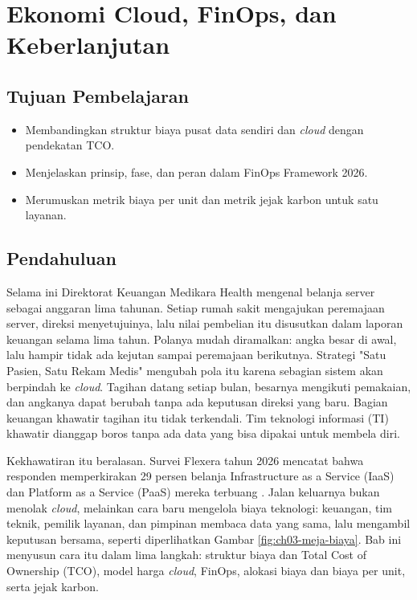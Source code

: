 \chapter{Ekonomi Cloud, FinOps, dan Keberlanjutan}
\label{ch:ch03}

\section*{Tujuan Pembelajaran}
\begin{itemize}
  \item Membandingkan struktur biaya pusat data sendiri dan \textit{cloud} dengan pendekatan TCO.
  \item Menjelaskan prinsip, fase, dan peran dalam FinOps Framework 2026.
  \item Merumuskan metrik biaya per unit dan metrik jejak karbon untuk satu layanan.
\end{itemize}

\section{Pendahuluan}

Selama ini Direktorat Keuangan Medikara Health mengenal belanja server sebagai anggaran lima
tahunan. Setiap rumah sakit mengajukan peremajaan server, direksi menyetujuinya, lalu nilai
pembelian itu disusutkan dalam laporan keuangan selama lima tahun. Polanya mudah diramalkan: angka
besar di awal, lalu hampir tidak ada kejutan sampai peremajaan berikutnya. Strategi "Satu Pasien,
Satu Rekam Medis" mengubah pola itu karena sebagian sistem akan berpindah ke \textit{cloud}. Tagihan
datang setiap bulan, besarnya mengikuti pemakaian, dan angkanya dapat berubah tanpa ada keputusan
direksi yang baru. Bagian keuangan khawatir tagihan itu tidak terkendali. Tim teknologi informasi
(TI) khawatir dianggap boros tanpa ada data yang bisa dipakai untuk membela diri.

Kekhawatiran itu beralasan. Survei Flexera tahun 2026 mencatat bahwa responden memperkirakan 29
persen belanja Infrastructure as a Service (IaaS) dan Platform as a Service (PaaS) mereka terbuang
\cite{flexera2026}. Jalan keluarnya bukan menolak \textit{cloud}, melainkan cara baru mengelola
biaya teknologi: keuangan, tim teknik, pemilik layanan, dan pimpinan membaca data yang sama, lalu
mengambil keputusan bersama, seperti diperlihatkan Gambar \ref{fig:ch03-meja-biaya}. Bab ini
menyusun cara itu dalam lima langkah: struktur biaya dan Total Cost of Ownership (TCO), model harga
\textit{cloud}, FinOps, alokasi biaya dan biaya per unit, serta jejak karbon.

